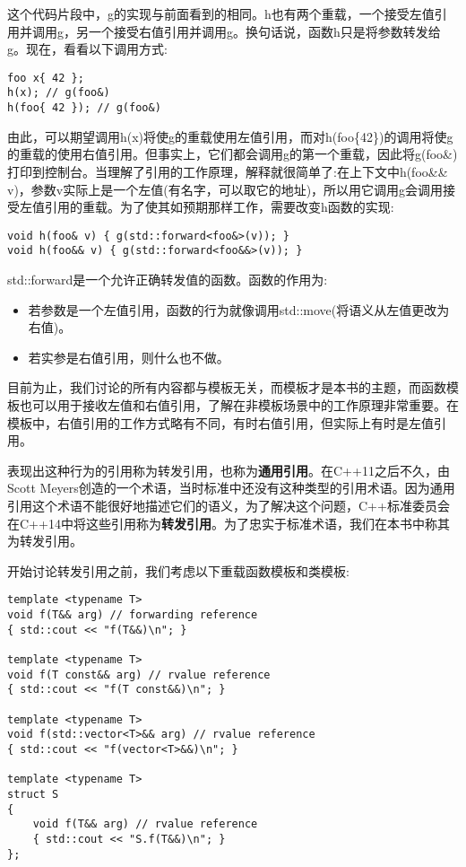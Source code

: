 这个代码片段中，g的实现与前面看到的相同。h也有两个重载，一个接受左值引用并调用g，另一个接受右值引用并调用g。换句话说，函数h只是将参数转发给g。现在，看看以下调用方式:

\begin{lstlisting}[style=styleCXX]
foo x{ 42 };
h(x); // g(foo&)
h(foo{ 42 }); // g(foo&)
\end{lstlisting}

由此，可以期望调用h(x)将使g的重载使用左值引用，而对h(foo\{42\})的调用将使g的重载的使用右值引用。但事实上，它们都会调用g的第一个重载，因此将g(foo\&)打印到控制台。当理解了引用的工作原理，解释就很简单了:在上下文中h(foo\&\& v)，参数v实际上是一个左值(有名字，可以取它的地址)，所以用它调用g会调用接受左值引用的重载。为了使其如预期那样工作，需要改变h函数的实现:

\begin{lstlisting}[style=styleCXX]
void h(foo& v) { g(std::forward<foo&>(v)); }
void h(foo&& v) { g(std::forward<foo&&>(v)); }
\end{lstlisting}

std::forward是一个允许正确转发值的函数。函数的作用为:

\begin{itemize}
\item
若参数是一个左值引用，函数的行为就像调用std::move(将语义从左值更改为右值)。

\item
若实参是右值引用，则什么也不做。
\end{itemize}

目前为止，我们讨论的所有内容都与模板无关，而模板才是本书的主题，而函数模板也可以用于接收左值和右值引用，了解在非模板场景中的工作原理非常重要。在模板中，右值引用的工作方式略有不同，有时右值引用，但实际上有时是左值引用。

表现出这种行为的引用称为转发引用，也称为\textbf{通用引用}。在C++11之后不久，由Scott Meyers创造的一个术语，当时标准中还没有这种类型的引用术语。因为通用引用这个术语不能很好地描述它们的语义，为了解决这个问题，C++标准委员会在C++14中将这些引用称为\textbf{转发引用}。为了忠实于标准术语，我们在本书中称其为转发引用。

开始讨论转发引用之前，我们考虑以下重载函数模板和类模板:

\begin{lstlisting}[style=styleCXX]
template <typename T>
void f(T&& arg) // forwarding reference
{ std::cout << "f(T&&)\n"; }

template <typename T>
void f(T const&& arg) // rvalue reference
{ std::cout << "f(T const&&)\n"; }

template <typename T>
void f(std::vector<T>&& arg) // rvalue reference
{ std::cout << "f(vector<T>&&)\n"; }

template <typename T>
struct S
{
	void f(T&& arg) // rvalue reference
	{ std::cout << "S.f(T&&)\n"; }
};
\end{lstlisting}

